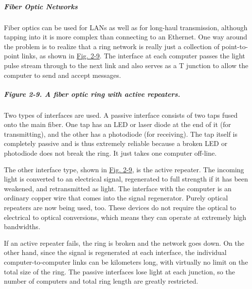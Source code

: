 \documentclass[b5paper,11pt]{memoir}
\begin{document}
\protect\hypertarget{0130661023_ch02lev1sec2.htmlux5cux23ch02lev3sec3}{}{}

\subparagraph{Fiber Optic Networks}

Fiber optics can be used for LANs as well as for long-haul transmission,
although tapping into it is more complex than connecting to an Ethernet.
One way around the problem is to realize that a ring network is really
just a collection of point-to-point links, as shown in
\protect\hyperlink{0130661023_ch02lev1sec2.htmlux5cux23ch02fig09}{Fig.
2-9}. The interface at each computer passes the light pulse stream
through to the next link and also serves as a T junction to allow the
computer to send and accept messages.

\subparagraph[Figure 2-9. A fiber optic ring with active
repeaters.]{\texorpdfstring{\protect\hypertarget{0130661023_ch02lev1sec2.htmlux5cux23ch02fig09}{}{}Figure
2-9. A fiber optic ring with active
repeaters.}{Figure 2-9. A fiber optic ring with active repeaters.}}


Two types of interfaces are used. A passive interface consists of two
taps fused onto the main fiber. One tap has an LED or laser diode at the
end of it (for transmitting), and the other has a photodiode (for
receiving). The tap itself is completely passive and is thus extremely
reliable because a broken LED or photodiode does not break the ring. It
just takes one computer off-line.

The other interface type, shown in
\protect\hyperlink{0130661023_ch02lev1sec2.htmlux5cux23ch02fig09}{Fig.
2-9}, is the {active repeater}. The incoming light is converted to an
electrical signal, regenerated to full strength if it has been weakened,
and retransmitted as light. The interface with the computer is an
ordinary copper wire that comes into the signal regenerator. Purely
optical repeaters are now being used, too. These devices do not require
the optical to electrical to optical conversions, which means they can
operate at extremely high bandwidths.

If an active repeater fails, the ring is broken and the network goes
down. On the other hand, since the signal is regenerated at each
interface, the individual computer-to-computer links can be kilometers
long, with virtually no limit on the total size of the ring. The passive
interfaces lose light at each junction, so the number of computers and
total ring length are greatly restricted.
\end{document}
